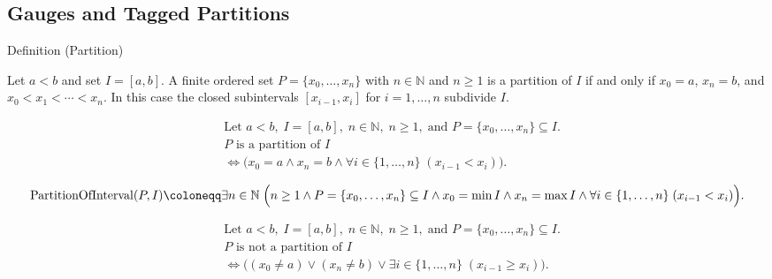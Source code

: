 
\subsection*{Gauges and Tagged Partitions}
\label{sec:gauges-tagged-partitions}

\begin{definitionbox}{Definition (Partition)}
\begin{definition}[Partition]
\label{def:interval-partition}
Let $a<b$ and set $I=[a,b]$. A finite ordered set $P=\{x_0,\ldots,x_n\}$ with $n\in\mathbb{N}$ and $n\ge 1$ is a partition of $I$ if and only if $x_0=a$, $x_n=b$, and $x_0<x_1<\cdots<x_n$. In this case the closed subintervals $[x_{i-1},x_i]$ for $i=1,\ldots,n$ subdivide $I$.
\end{definition}
\end{definitionbox}

\begin{remark*}
\[
\begin{aligned}
&\text{Let } a<b,\; I=[a,b],\; n\in\mathbb{N},\; n\ge 1,\; \text{and } P=\{x_0,\ldots,x_n\}\subseteq I.\\
&P \text{ is a partition of } I\\
&\Longleftrightarrow \bigl(x_0=a \land x_n=b \land \forall i\in\{1,\ldots,n\}\;(x_{i-1}<x_i)\bigr).
\end{aligned}
\]
\end{remark*}

\begin{remark*}
\[
\operatorname{PartitionOfInterval}(P,I) \coloneqq
\exists n\in\mathbb{N}\;\Bigl(n\ge 1 \land P=\{x_0,\ldots,x_n\}\subseteq I
\land x_0=\min I \land x_n=\max I
\land \forall i\in\{1,\ldots,n\}\;(x_{i-1}<x_i)\Bigr).
\]
\end{remark*}

\begin{remark*}
\[
\begin{aligned}
&\text{Let } a<b,\; I=[a,b],\; n\in\mathbb{N},\; n\ge 1,\; \text{and } P=\{x_0,\ldots,x_n\}\subseteq I.\\
&P \text{ is not a partition of } I\\
&\Longleftrightarrow \bigl((x_0\ne a) \lor (x_n\ne b) \lor \exists i\in\{1,\ldots,n\}\;(x_{i-1}\ge x_i)\bigr).
\end{aligned}
\]
\end{remark*}


